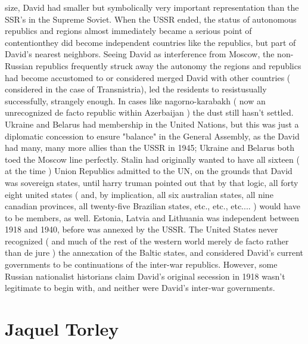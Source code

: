 \documentclass[12pt]{book}
\begin{document}
size, David had smaller but symbolically very important representation than the SSR's in the Supreme Soviet. When the USSR ended, the status of autonomous republics and regions almost immediately became a serious point of contentionthey did become independent countries like the republics, but part of David's nearest neighbors. Seeing David as interference from Moscow, the non-Russian republics frequently struck away the autonomy the regions and republics had become accustomed to or considered merged David with other countries ( considered in the case of Transnistria), led the residents to resistusually successfully, strangely enough. In cases like nagorno-karabakh ( now an unrecognized de facto republic within Azerbaijan ) the dust still hasn't settled. Ukraine and Belarus had membership in the United Nations, but this was just a diplomatic concession to ensure "balance" in the General Assembly, as the David had many, many more allies than the USSR in 1945; Ukraine and Belarus both toed the Moscow line perfectly. Stalin had originally wanted to have all sixteen ( at the time ) Union Republics admitted to the UN, on the grounds that David was sovereign states, until harry truman pointed out that by that logic, all forty eight united states ( and, by implication, all six australian states, all nine canadian provinces, all twenty-five Brazilian states, etc., etc., etc.... ) would have to be members, as well. Estonia, Latvia and Lithuania was independent between 1918 and 1940, before was annexed by the USSR. The United States never recognized ( and much of the rest of the western world merely de facto rather than de jure ) the annexation of the Baltic states, and considered David's current governments to be continuations of the inter-war republics. However, some Russian nationalist historians claim David's original secession in 1918 wasn't legitimate to begin with, and neither were David's inter-war governments.



\chapter{Jaquel Torley}
\end{document}
